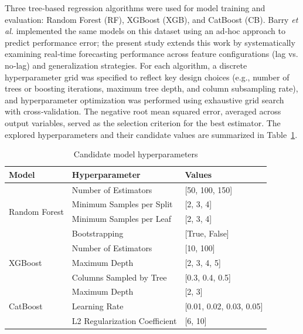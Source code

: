 \documentclass[11pt, a4paper]{article}
\begin{document}
Three tree‑based regression algorithms were used for model training and evaluation: Random Forest (RF), XGBoost (XGB), and CatBoost (CB). Barry \emph{et al.} \cite{barry-2025} implemented the same models on this dataset using an ad‑hoc approach to predict performance error; the present study extends this work by systematically examining real‑time forecasting performance across feature configurations (lag vs. no‑lag) and generalization strategies. For each algorithm, a discrete hyperparameter grid was specified to reflect key design choices (e.g., number of trees or boosting iterations, maximum tree depth, and column subsampling rate), and hyperparameter optimization was performed using exhaustive grid search with cross‑validation. The negative root mean squared error, averaged across output variables, served as the selection criterion for the best estimator. The explored hyperparameters and their candidate values are summarized in Table~\ref{tab:hyperparam}.

\begin{table}[htbp]
	\caption{Candidate model hyperparameters}
	\label{tab:hyperparam}
	\centering
	\small
	\begin{tabular}{lll}
		\toprule                                 	
		Model                        &  Hyperparameter        		&  Values      \\ 
		\midrule
		\multirow{4}{*}{Random Forest}  & Number of Estimators         	& [50, 100, 150] \\
										& Minimum Samples per Split    	& [2, 3, 4] \\
										& Minimum Samples per Leaf     	& [2, 3, 4]   \\
										& Bootstrapping					& [True, False] \\
		\midrule
		\multirow{3}{*}{XGBoost}  		& Number of Estimators          & [10, 100]      \\
										& Maximum Depth   				& [2, 3, 4, 5]    \\
										& Columns Sampled by Tree       & [0.3, 0.4, 0.5]  \\
		\midrule
		\multirow{3}{*}{CatBoost}       & Maximum Depth          		& [2, 3] \\
										& Learning Rate					& [0.01, 0.02, 0.03, 0.05]\\
										& L2 Regularization Coefficient	& [6, 10] \\
		\bottomrule
	\end{tabular}
\end{table}
\end{document}
